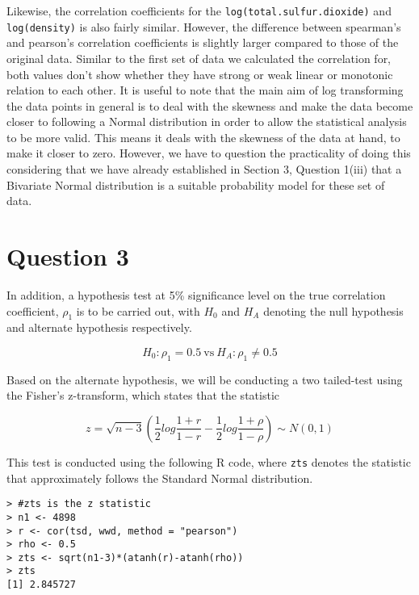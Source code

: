 \documentclass[11pt,a4]{article}
\begin{document}
\bigskip

Likewise, the correlation coefficients for the \verb|log(total.sulfur.dioxide)| and \verb|log(density)| is also fairly similar. However, the difference between spearman’s and pearson’s correlation coefficients is slightly larger compared to those of the original data. Similar to the first set of data we calculated the correlation for, both values don’t show whether they have strong or weak linear or monotonic relation to each other. It is useful to note that the main aim of log transforming the data points in general is to deal with the skewness and make the data become closer to following a Normal distribution in order to allow the statistical analysis to be more valid. This means it deals with the skewness of the data at hand, to make it closer to zero. However, we have to question the practicality of doing this considering that we have already established in Section 3, Question 1(iii) that a Bivariate Normal distribution is a suitable probability model for these set of data. 

\bigskip

\section{Question 3}
In addition, a hypothesis test at 5\% significance level on the true correlation coefficient, $\rho_{1}$ is to be carried out, with $H_{0}$ and $H_{A}$ denoting the null hypothesis and alternate hypothesis respectively.

\bigskip
 \[ H_{0}: \rho_{1} = 0.5  \:\mbox{vs} \: H_{A}: \rho_{1} \neq 0.5 \]

\bigskip

Based on the alternate hypothesis, we will be conducting a two tailed-test using the Fisher’s z-transform, which states that the statistic

\bigskip

\[z = \sqrt{n-3}(\frac 12 log\frac{1+r}{1-r} - \frac 12 log\frac{1 + \rho}{1 - \rho} ) \sim N(0,1)\]

\bigskip

This test is conducted using the following R code, where \verb|zts| denotes the statistic that approximately follows the Standard Normal distribution. 

\begin{verbatim}
> #zts is the z statistic
> n1 <- 4898
> r <- cor(tsd, wwd, method = "pearson")
> rho <- 0.5
> zts <- sqrt(n1-3)*(atanh(r)-atanh(rho))
> zts
[1] 2.845727
\end{verbatim}
\end{document}
